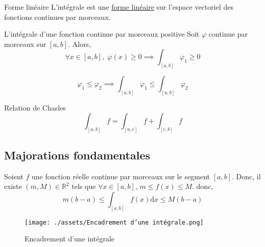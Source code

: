 \begin{Theorem}{Forme linéaire}{}
L'intégrale est une \underline{forme linéaire} sur l'{espace vectoriel des fonctions continues par morceaux}.
\end{Theorem}



\begin{Prop}{L'intégrale d'une fonction continue par morceaux positive}{}
  Soit $\varphi$ continue par morceaux sur $[a,b]$. Alors, 
  \begin{equation}
    \forall x \in [a,b], \; \varphi(x) \ge 0 \implies \int _{[a,b]} \varphi_1  \ge 0
  \end{equation}
\end{Prop}

\begin{Corollary}{}{}
\begin{equation}
  \varphi_1 \le \varphi_2 \implies \int _{[a,b]} \varphi_1 \le \int _{[a,b]} \varphi_2
\end{equation}
\end{Corollary}

\begin{Prop}{Relation de Chasles}{}
\begin{equation}
  \int_{[a,b]}f = \int_{[a,c]}^{} f + \int_{[c,b]}^{}f
\end{equation}
\end{Prop}



\subsection{Majorations fondamentales} %
\label{sub: Majorations fondamentales} %

\begin{Theorem}{}{}
  Soient $f$ une fonction réelle continue par morceaux sur le segment $[a,b]$. Donc, il existe $(m, M) \in \mathbb{R}^{2}$ tels que $\forall x \in [a,b]$, $m \le f(x) \le M$. donc, 
  \begin{equation}
    \boxed{m(b-a) \le \int _{[a,b]} f(x) \mathrm{d} x \le M(b-a)}
  \end{equation}

  \begin{figure}[H] %
    \centering
    \texttt{[image: ./assets/Encadrement d'une intégrale.png]}
    \caption{Encadrement d'une intégrale}
    \label{fig:Encadrement d'une intégrale.png}
  \end{figure}
\end{Theorem}

